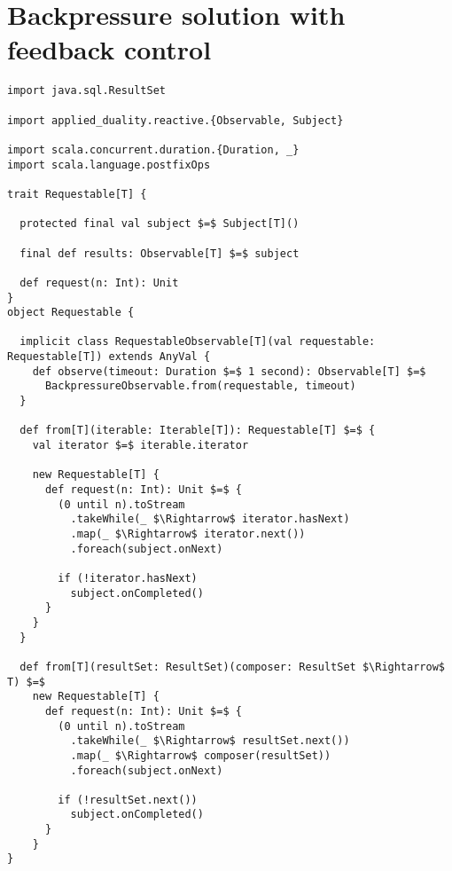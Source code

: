 \chapter{Backpressure solution with feedback control}
\label{app:backpressure-solution}

\begin{lstlisting}[style=ScalaStyle, caption={Universal, interactive interface, \code{Requestable}, used in the feedback system}]
import java.sql.ResultSet

import applied_duality.reactive.{Observable, Subject}

import scala.concurrent.duration.{Duration, _}
import scala.language.postfixOps

trait Requestable[T] {

  protected final val subject $=$ Subject[T]()

  final def results: Observable[T] $=$ subject

  def request(n: Int): Unit
}
object Requestable {

  implicit class RequestableObservable[T](val requestable: Requestable[T]) extends AnyVal {
    def observe(timeout: Duration $=$ 1 second): Observable[T] $=$
      BackpressureObservable.from(requestable, timeout)
  }

  def from[T](iterable: Iterable[T]): Requestable[T] $=$ {
    val iterator $=$ iterable.iterator

    new Requestable[T] {
      def request(n: Int): Unit $=$ {
        (0 until n).toStream
          .takeWhile(_ $\Rightarrow$ iterator.hasNext)
          .map(_ $\Rightarrow$ iterator.next())
          .foreach(subject.onNext)

        if (!iterator.hasNext)
          subject.onCompleted()
      }
    }
  }

  def from[T](resultSet: ResultSet)(composer: ResultSet $\Rightarrow$ T) $=$
    new Requestable[T] {
      def request(n: Int): Unit $=$ {
        (0 until n).toStream
          .takeWhile(_ $\Rightarrow$ resultSet.next())
          .map(_ $\Rightarrow$ composer(resultSet))
          .foreach(subject.onNext)

        if (!resultSet.next())
          subject.onCompleted()
      }
    }
}
\end{lstlisting}

